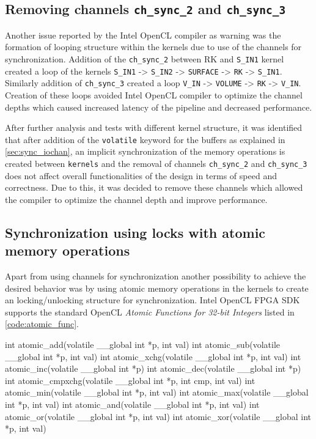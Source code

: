 \subsection*{Removing channels \texttt{ch\_sync\_2} and \texttt{ch\_sync\_3}}

Another issue reported by the Intel OpenCL compiler as warning was the formation of looping
structure within the kernels due to use of the channels for synchronization.
Addition of the \texttt{ch\_sync\_2} between RK and \texttt{S\_IN1} kernel created
a loop of the kernels \texttt{S\_IN1} -> \texttt{S\_IN2} -> \texttt{SURFACE} -> \texttt{RK} -> \texttt{S\_IN1}.
Similarly addition of \texttt{ch\_sync\_3} created a loop \texttt{V\_IN} -> \texttt{VOLUME} -> \texttt{RK} -> \texttt{V\_IN}.
Creation of these loops avoided Intel OpenCL compiler to optimize the channel depths
which caused increased latency of the pipeline and decreased performance.

After further analysis and tests with different kernel structure, it was identified that
after addition of the \texttt{volatile} keyword for the buffers as explained in \ref{sec:sync_iochan},
an implicit synchronization of the memory operations is created between \texttt{kernels} and the removal of channels \texttt{ch\_sync\_2} and
\texttt{ch\_sync\_3} does not affect overall functionalities of the design in terms of speed
and correctness. Due to this, it was decided to remove these channels which allowed the
compiler to optimize the channel depth and improve performance.

\subsection{Synchronization using locks with atomic memory operations}

Apart from using channels for synchronization another possibility to achieve
the desired behavior was by using atomic memory operations in the kernels
to create an locking/unlocking structure for synchronization. Intel
OpenCL FPGA SDK supports the standard OpenCL \textit{Atomic Functions for 32-bit Integers}
listed in \ref{code:atomic_func}.

\begin{CppCode}[caption=Interger versions of the atomic operations supported by Intel
    OpenCL FPGA SDK, frame=tlrb, label=code:atomic_func, float]
int atomic_add(volatile __global int *p, int val)
int atomic_sub(volatile __global int *p, int val)
int atomic_xchg(volatile __global int *p, int val)
int atomic_inc(volatile __global int *p)
int atomic_dec(volatile __global int *p)
int atomic_cmpxchg(volatile __global int *p, int cmp, int val)
int atomic_min(volatile __global int *p, int val)
int atomic_max(volatile __global int *p, int val)
int atomic_and(volatile __global int *p, int val)
int atomic_or(volatile __global int *p, int val)
int atomic_xor(volatile __global int *p, int val)
\end{CppCode}


